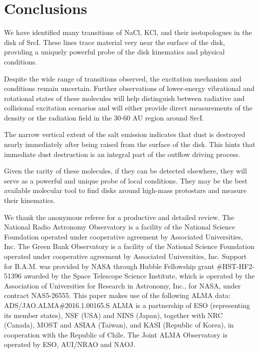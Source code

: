\documentclass[twocolumn]{aastex62}
\newcommand{\sourcei}{SrcI\xspace}
\begin{document}








\section{Conclusions}
We have identified many transitions of NaCl, KCl, and their isotopologues in
the disk of \sourcei.  These lines trace material very near the surface of the
disk, providing a uniquely powerful probe of the disk kinematics and physical
conditions.

Despite the wide range of transitions observed, the excitation mechanism and
conditions remain uncertain.  Further observations of lower-energy vibrational
and rotational states of these molecules will help distinguish between
radiative and collisional excitation scenarios and will either provide
direct measurements of the density or the radiation field in the 30-60 AU
region around \sourcei.

The narrow vertical extent of the salt emission indicates that dust is
destroyed nearly immediately after being raised from the surface of the disk.
This hints that immediate dust destruction is an integral part of the outflow
driving process.

Given the rarity of these molecules, if they can be detected elsewhere,
they will serve as a powerful and unique probe of local conditions.
They may be the best available molecular tool to find disks around high-mass
protostars and measure their kinematics.  



\acknowledgements
We thank the anonymous referee for a productive and detailed review.
The National Radio Astronomy Observatory is a facility of the National Science
Foundation operated under cooperative agreement by Associated Universities,
Inc. The Green Bank Observatory is a facility of the National Science
Foundation operated under cooperative agreement by Associated Universities,
Inc. Support for B.A.M. was provided by NASA through Hubble Fellowship grant
\#HST-HF2-51396 awarded by the Space Telescope Science Institute, which is
operated by the Association of Universities for Research in Astronomy, Inc.,
for NASA, under contract NAS5-26555. 
This paper makes use of the following ALMA data: ADS/JAO.ALMA\#2016.1.00165.S
ALMA is a partnership of ESO (representing its member states), NSF (USA) and
NINS (Japan), together with NRC (Canada), MOST and ASIAA (Taiwan), and KASI
(Republic of Korea), in cooperation with the Republic of Chile. The Joint ALMA
Observatory is operated by ESO, AUI/NRAO and NAOJ.
\end{document}
